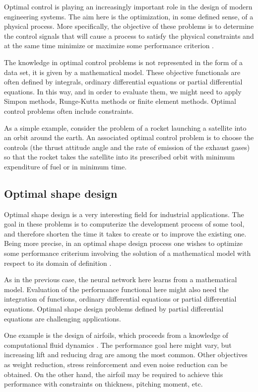 Optimal control is playing an increasingly important role in the
design of modern engineering systems. The aim
here is the optimization, in some defined sense, of a physical
process. More specifically, the objective of these problems is to
determine the control signals that will cause a process to satisfy
the physical constraints and at the same time minimize or maximize
some performance criterion \cite{Kirk1970} \cite{BalsaCanto2001}. 

The knowledge in optimal control problems is not represented in the form of a data set, it is given by a mathematical model. 
These objective functionals are often defined by integrals, ordinary differential equations or partial differential equations. 
In this way, and in order to evaluate them, we might need to apply Simpon methods, Runge-Kutta methods or finite element methods. 
Optimal control problems often include constraints. 

As a simple example, consider the problem of a rocket launching a
satellite into an orbit around the earth. An associated optimal
control problem is to choose the controls (the thrust attitude angle
and the rate of emission of the exhaust gases) so that the rocket
takes the satellite into its prescribed orbit with minimum
expenditure of fuel or in minimum time.

\subsection{Optimal shape design}

Optimal shape design is a very interesting field for industrial
applications. The goal in these problems
is to computerize the development process of some tool, and
therefore shorten the time it takes to create or to improve the
existing one. Being more precise, in an optimal shape design process
one wishes to optimize some performance criterium involving the
solution of a mathematical model with respect to its domain of
definition \cite{Bucur2005}. 

As in the previous case, the neural network here learns from a mathematical model. 
Evaluation of the performance functional here might also need the integration of functions, ordinary differential equations or partial differential equations. 
Optimal shape design problems defined by partial differential equations are challenging applications. 

One example is the design of airfoils,
which proceeds from a knowledge of computational fluid dynamics
\cite{Eyi1994} \cite{Mohammadi2004}. The performance goal here might
vary, but increasing lift and reducing drag are among the most common. Other objectives as weight reduction, stress reinforcement and
even noise reduction can be obtained. On the other hand, the airfoil
may be required to achieve this performance with constraints on
thickness, pitching moment, etc.

